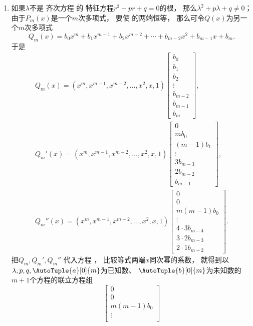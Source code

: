 \begin{enumerate}
	\item 如果\(\lambda\)不是
	齐次方程  的
	特征方程\(r^2+pr+q=0\)的根，
	那么\(\lambda^2+p\lambda+q\neq0\)；
	由于\(P_m(x)\)是一个\(m\)次多项式，
	要使  的两端恒等，
	那么可令\(Q(x)\)为另一个\(m\)次多项式\begin{equation}
		Q_m(x) = b_0 x^m + b_1 x^{m-1} + b_2 x^{m-2}
			+ \dotsb + b_{m-2} x^2 + b_{m-1} x + b_m.
	\end{equation}
	于是\begin{gather*}
		Q_m(x) = (x^m,x^{m-1},x^{m-2},\dotsc,x^2,x,1)
		\begin{bmatrix}
			b_0 \\ b_1 \\ b_2 \\ \vdots \\ b_{m-2} \\ b_{m-1} \\ b_m
		\end{bmatrix}, \\
		Q_m'(x) = (x^m,x^{m-1},x^{m-2},\dotsc,x^2,x,1)
		\begin{bmatrix}
			0 \\ m b_0 \\ (m-1) b_1 \\ \vdots \\
			3 b_{m-3} \\ 2 b_{m-2} \\ b_{m-1}
		\end{bmatrix}, \\
		Q_m''(x) = (x^m,x^{m-1},x^{m-2},\dotsc,x^2,x,1)
		\begin{bmatrix}
			0 \\ 0 \\ m(m-1) b_0 \\ \vdots \\
			4\cdot3 b_{m-4} \\ 3\cdot2 b_{m-3} \\ 2\cdot1 b_{m-2}
		\end{bmatrix}.
	\end{gather*}
	把\(Q_m,Q_m',Q_m''\)
	代入方程 ，
	比较等式两端\(x\)同次幂的系数，
	就得到以\(\lambda,p,q,\AutoTuple{a}[0]{m}\)为已知数、
	\(\AutoTuple{b}[0]{m}\)为未知数的\(m+1\)个方程的联立方程组\[
		\begin{bmatrix}
			0 \\ 0 \\ m(m-1) b_0 \\ \vdots \\

\end{bmatrix}\]
\end{enumerate}
